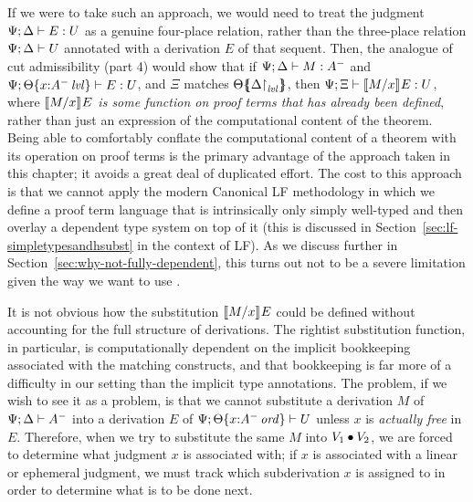If we were to take such an approach, we would need to treat the
judgment ${\Psi}; {\Delta} \vdash {E} : {U}$ as a genuine four-place relation,
rather than the three-place relation ${\Psi};{\Delta} \vdash {U} \mathstrut$ annotated
with a derivation $E$ of that sequent.  Then, the analogue of cut
admissibility (part 4) would show that if
${\Psi}; {\Delta} \vdash {M} : {A^-}$ and
${\Psi}; {{\Theta}\{{x{:}{A^-}\,{{\it lvl}}}\}} \vdash {E} : {U}$, and $\Xi$
matches ${\Theta}\mbox{$\{\hspace{-4pt}\{$}{\ensuremath{{\Delta}{\upharpoonright}_{{\it lvl}}}}\mbox{$\}\hspace{-4pt}\}$}$, then
${\Psi}; {\Xi} \vdash {\llbracket {M}/{x} \rrbracket^{} {E}} : {U}$, where {\it $\llbracket {M}/{x} \rrbracket^{} {E}$
  is some function on proof terms that has already been defined},
rather than just an expression of the computational content of the
theorem. Being able to comfortably conflate the computational content
of a theorem with its operation on proof terms is the primary
advantage of the approach taken in this chapter; it avoids a great
deal of duplicated effort. The cost to this approach is that we cannot
apply the modern Canonical LF methodology in which we define a proof
term language that is intrinsically only simply well-typed and then
overlay a dependent type system on top of it (this is discussed in
Section~\ref{sec:lf-simpletypesandhsubst} in the context of LF). As we
discuss further in Section~\ref{sec:why-not-fully-dependent}, this
turns out not to be a severe limitation given the way we want to use
\ollll.

It is not obvious how the substitution 
$\llbracket {M}/{x} \rrbracket^{} {E}$ could be defined without accounting for the 
full structure of derivations. The rightist substitution function,
in particular, is computationally dependent
on the implicit bookkeeping associated with the matching constructs, and
that bookkeeping is far more of a difficulty in our setting than the
implicit type annotations. 
The problem, if we wish to see it as a problem, is that we cannot
substitute a derivation $M$ of ${\Psi};{\Delta} \vdash {A^-} \mathstrut$
into a derivation $E$ of ${\Psi};{{\Theta}\{{x{:}{A^-}\,{{\it ord}}}\}} \vdash {U} \mathstrut$
unless $x$ is {\it actually free} in $E$. Therefore, when we try to
substitute the same $M$ into ${V_1} \mathbin{\bullet} {V_2}$, we are forced to determine
what judgment $x$ is associated with; if $x$ is associated with a
linear or ephemeral judgment, we must track which subderivation 
$x$ is assigned to in order to determine what is to be done next. 

